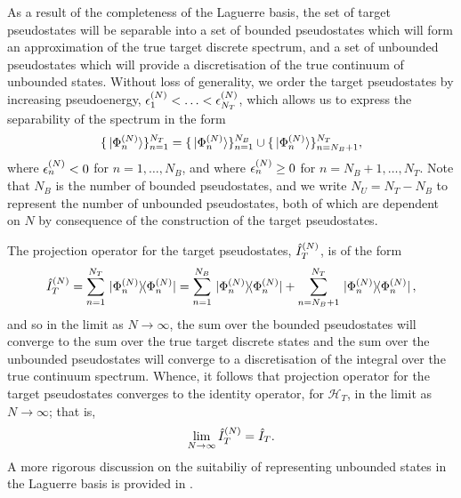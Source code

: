 \documentclass[draft]{article}
\begin{document}
As a result of the completeness of the Laguerre basis, the set of target
pseudostates will be separable into a set of bounded pseudostates which will
form an approximation of the true target discrete spectrum, and a set of
unbounded pseudostates which will provide a discretisation of the true continuum
of unbounded states.
Without loss of generality, we order the target pseudostates by increasing
pseudoenergy, $\epsilon_{1}^{(N)} < \dotsc < \epsilon_{N_{T}}^{(N)}$,
which allows us to express the separability of the spectrum in the form
\begin{equation}
  \label{eq:target-spectrum-separable}
  \lbrace\ket*{\Phi_{n}^{(N)}}\rbrace_{n = 1}^{N_{T}}
  =
  \lbrace\ket*{\Phi_{n}^{(N)}}\rbrace_{n = 1}^{N_{B}}
  \cup
  \lbrace\ket*{\Phi_{n}^{(N)}}\rbrace_{n = N_{B} + 1}^{N_{T}}
  ,
\end{equation}
where $\epsilon_{n}^{(N)} < 0$ for $n = 1, \dotsc, N_{B}$, and where
$\epsilon_{n}^{(N)} \geq 0$ for $n = N_{B} + 1, \dotsc, N_{T}$.
Note that $N_{B}$ is the number of bounded pseudostates, and we write
$N_{U} = N_{T} - N_{B}$ to represent the number of unbounded pseudostates, both of
which are dependent on $N$ by consequence of the construction of the target
pseudostates.

The projection operator for the target pseudostates, $\hat{I}_{T}^{(N)}$, is
of the form
\begin{equation}
  \label{eq:target-projection}
  \hat{I}_{T}^{(N)}
  =
  \sum_{n = 1}^{N_{T}}
  \ketbra*
  {\Phi_{n}^{(N)}}
  {\Phi_{n}^{(N)}}
  =
  \sum_{n = 1}^{N_{B}}
  \ketbra*
  {\Phi_{n}^{(N)}}
  {\Phi_{n}^{(N)}}
  +
  \sum_{n = N_{B} + 1}^{N_{T}}
  \ketbra*
  {\Phi_{n}^{(N)}}
  {\Phi_{n}^{(N)}}
  ,
\end{equation}
and so in the limit as $N \to \infty$, the sum over the bounded pseudostates
will converge to the sum over the true target discrete states
and the sum over the unbounded pseudostates will converge to a discretisation of
the integral over the true continuum spectrum.
Whence, it follows that projection operator for the target pseudostates
converges to the identity operator, for $\mathcal{H}_{T}$,
in the limit as $N \to \infty$; that is,
\begin{equation}
  \label{eq:target-projection-convergence}
  \lim_{N \to \infty}
  \hat{I}_{T}^{(N)}
  =
  \hat{I}_{T}
  .
\end{equation}
A more rigorous discussion on the suitabiliy of representing unbounded states in
the Laguerre basis is provided in \cite[5-9]{BRAY19951}.
\end{document}
